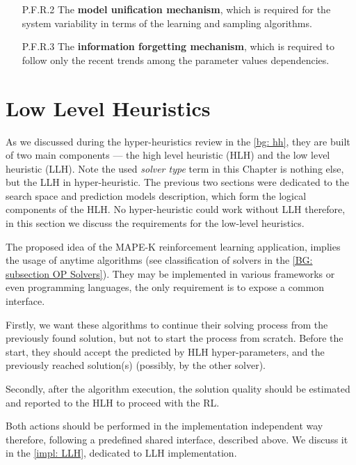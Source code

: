\begin{itemize}
\begin{enumerate}
		\item[P.F.R.2] The \textbf{model unification mechanism}, which is required for the system variability in terms of the learning and sampling algorithms.
		
		\item[P.F.R.3] The \textbf{information forgetting mechanism}, which is required to follow only the recent trends among the parameter values dependencies.
	\end{enumerate}
\end{itemize}

\section{Low Level Heuristics}\label{concept: llh}
As we discussed during the hyper-heuristics review in the \cref{bg: hh}, they are built of two main components — the high level heuristic (HLH) and the low level heuristic (LLH). Note the used \emph{solver type} term in this Chapter is nothing else, but the LLH in hyper-heuristic. The previous two sections were dedicated to the search space and prediction models description, which form the logical components of the HLH. No hyper-heuristic could work without LLH therefore, in this section we discuss the requirements for the low-level heuristics.

The proposed idea of the MAPE-K reinforcement learning application, implies the usage of anytime algorithms (see classification of solvers in the \cref{BG: subsection OP Solvers}).
They may be implemented in various frameworks or even programming languages, the only requirement is to expose a common interface. 

Firstly, we want these algorithms to continue their solving process from the previously found solution, but not to start the process from scratch. Before the start, they should accept the predicted by HLH hyper-parameters, and the previously reached solution(s) (possibly, by the other solver). 

Secondly, after the algorithm execution, the solution quality should be estimated and reported to the HLH to proceed with the RL.

Both actions should be performed in the implementation independent way therefore, following a predefined shared interface, described above. We discuss it in the \cref{impl: LLH}, dedicated to LLH implementation.



